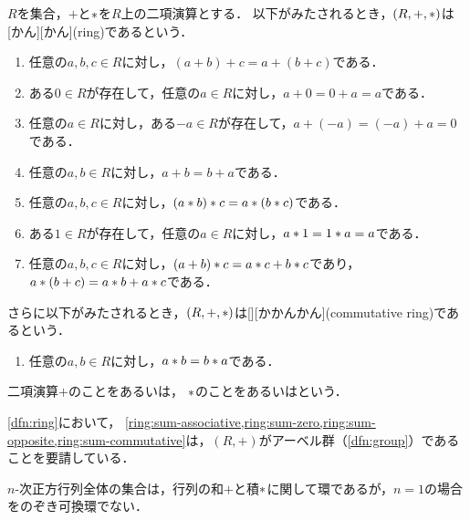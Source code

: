\documentclass[../sotsu.tex]{subfiles}
\begin{document}
\begin{definition}[環]
    \label{dfn:ring}
    $R$を集合，$+$と$\mathbin{\ast}$を$R$上の二項演算とする．
    以下がみたされるとき，$(R, +, \mathbin{\ast})$は[かん][かん](ring)であるという．
    \begin{enumerate}[ref={条件-\arabic*}]
        \item \label{ring:sum-associative} 任意の$a, b, c \in R$に対し，$(a + b) + c = a + (b + c)$である．
        \item \label{ring:sum-zero} ある$0 \in R$が存在して，任意の$a \in R$に対し，$a + 0 = 0 + a = a$である．
        \item \label{ring:sum-opposite} 任意の$a \in R$に対し，ある$-a \in R$が存在して，$a + (-a) = (-a) + a = 0$である．
        \item \label{ring:sum-commutative} 任意の$a, b \in R$に対し，$a + b = b + a$である．
        \item \label{ring:prod-associative} 任意の$a, b, c \in R$に対し，$(a \mathbin{\ast} b) \mathbin{\ast} c = a \mathbin{\ast} (b \mathbin{\ast} c)$である．
        \item \label{ring:prod-one} ある$1 \in R$が存在して，任意の$a \in R$に対し，$a \mathbin{\ast} 1 = 1 \mathbin{\ast} a = a$である．
        \item \label{ring:distributive} 任意の$a, b, c \in R$に対し，$(a + b) \mathbin{\ast} c = a \mathbin{\ast} c + b \mathbin{\ast} c$であり，$a \mathbin{\ast} (b + c) = a \mathbin{\ast} b + a \mathbin{\ast} c$である．
    \end{enumerate}
    さらに以下がみたされるとき，$(R, +, \mathbin{\ast})$は[][かかんかん](commutative ring)であるという．
    \begin{enumerate}[resume]
        \item 任意の$a, b \in R$に対し，$a \mathbin{\ast} b = b \mathbin{\ast} a$である．
    \end{enumerate}
    二項演算$+$のことをあるいは，
    $\mathbin{\ast}$のことをあるいはという．

\end{definition}

\cref{dfn:ring}において，
\cref{ring:sum-associative,ring:sum-zero,ring:sum-opposite,ring:sum-commutative}は，$(R, +)$がアーベル群（\cref{dfn:group}）であることを要請している．


\begin{example}
    $n$-次正方行列全体の集合は，行列の和$+$と積$\mathbin{\ast}$に関して環であるが，$n = 1$の場合をのぞき可換環でない．
\end{example}
\end{document}
